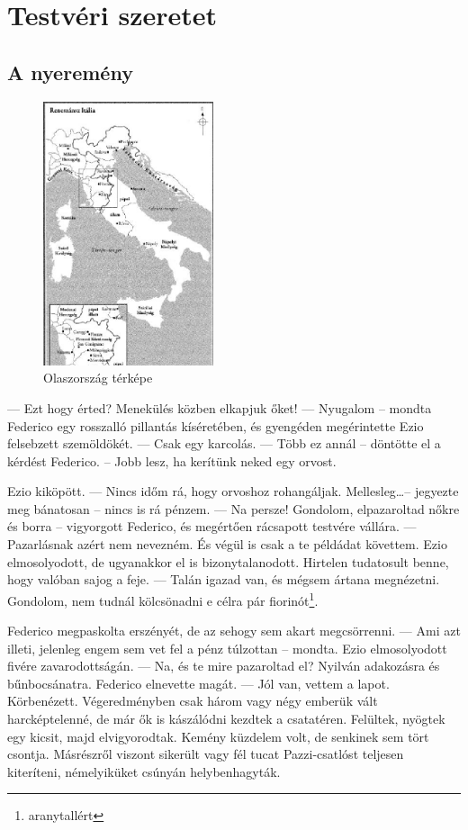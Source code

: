 \documentclass[12pt, a4paper, twoside]{report}
\theoremstyle{definition}
\theoremstyle{remark}
\begin{document}
\chapter{Testvéri szeretet}\label{2-fej}
\section{A nyeremény}

\begin{figure}[!ht]
    \centering
    \includegraphics[width=5cm]{italy.png}
    \caption{Olaszország térképe}
    \label{abra-olasz}
\end{figure}

— Ezt hogy érted? Menekülés közben elkapjuk őket! 
— Nyugalom -- mondta Federico egy rosszalló pillantás kíséretében, 
és gyengéden megérintette Ezio felsebzett szemöldökét. 
— Csak egy karcolás. 
— Több ez annál -- döntötte el a kérdést Federico. -- Jobb lesz, ha 
kerítünk neked egy orvost. 

Ezio kiköpött. 
— Nincs  időm  rá,  hogy  orvoshoz  rohangáljak.  Mellesleg\dots  -- 
jegyezte meg bánatosan -- nincs is rá pénzem. 
— Na persze! Gondolom, elpazaroltad nőkre és borra -- vigyorgott 
Federico, és megértően rácsapott testvére vállára. — Pazarlásnak azért nem nevezném. És végül is csak a te példádat követtem. 
Ezio elmosolyodott, de ugyanakkor el is bizonytalanodott. Hirtelen 
tudatosult benne, hogy valóban sajog a feje. 
— Talán  igazad  van,  és  mégsem  ártana  megnézetni.  Gondolom, 
nem tudnál kölcsönadni e célra pár fiorinót\footnote{aranytallért}. 

Federico  megpaskolta  erszényét,  de  az  sehogy  sem  akart 
megcsörrenni. 
— Ami azt  illeti,  jelenleg engem  sem  vet fel a pénz túlzottan -- 
mondta. Ezio elmosolyodott fivére zavarodottságán. 
— Na,  és  te  mire  pazaroltad  el?  Nyilván  adakozásra  és 
bűnbocsánatra. Federico elnevette magát. 
— Jól van, vettem a lapot. 
Körbenézett.  Végeredményben  csak  három  vagy  négy  emberük 
vált harcképtelenné, de már ők is kászálódni kezdtek a csatatéren. 
Felültek, nyögtek egy kicsit, majd elvigyorodtak. Kemény küzdelem volt, de senkinek sem tört csontja. Másrészről viszont sikerült vagy 
fél  tucat  Pazzi-csatlóst  teljesen  kiteríteni,  némelyiküket  csúnyán 
helybenhagyták. 
\end{document}
